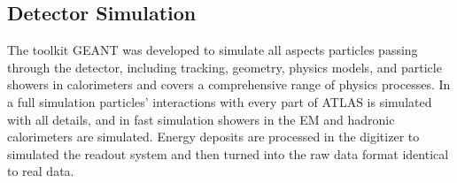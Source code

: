 \subsection{Detector Simulation}

The toolkit GEANT\cite{GEANT} was developed to simulate all aspects particles passing through the detector, including tracking, geometry, physics models, and particle showers in calorimeters and covers a comprehensive range of physics processes.  In a full simulation particles' interactions with every part of ATLAS is simulated with all details, and in fast simulation showers in the EM and hadronic calorimeters are simulated.  Energy deposits are processed in the digitizer to simulated the readout system and then turned into the raw data format identical to real data.